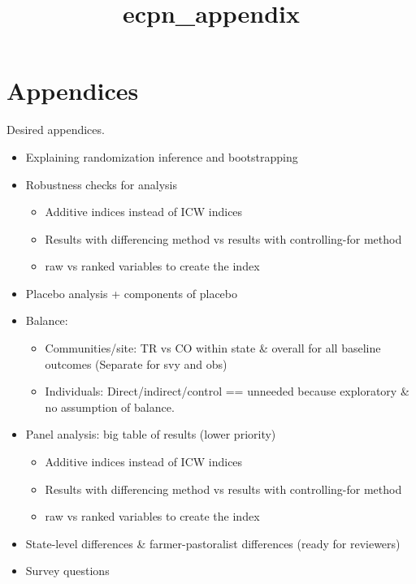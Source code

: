 \documentclass[
]{article}
\title{ecpn\_appendix}
\author{}
\date{\vspace{-2.5em}}
\providecommand{\tightlist}{%
  \setlength{\itemsep}{0pt}\setlength{\parskip}{0pt}}
\begin{document}
\maketitle

\hypertarget{appendices}{%
\section{Appendices}\label{appendices}}

Desired appendices.

\begin{itemize}
\tightlist
\item
  Explaining randomization inference and bootstrapping
\item
  Robustness checks for analysis

  \begin{itemize}
  \tightlist
  \item
    Additive indices instead of ICW indices
  \item
    Results with differencing method vs results with controlling-for
    method
  \item
    raw vs ranked variables to create the index
  \end{itemize}
\item
  Placebo analysis + components of placebo
\item
  Balance:

  \begin{itemize}
  \tightlist
  \item
    Communities/site: TR vs CO within state \& overall for all baseline
    outcomes (Separate for svy and obs)
  \item
    Individuals: Direct/indirect/control == unneeded because exploratory
    \& no assumption of balance.
  \end{itemize}
\item
  Panel analysis: big table of results (lower priority)

  \begin{itemize}
  \tightlist
  \item
    Additive indices instead of ICW indices
  \item
    Results with differencing method vs results with controlling-for
    method
  \item
    raw vs ranked variables to create the index
  \end{itemize}
\item
  State-level differences \& farmer-pastoralist differences (ready for
  reviewers)
\item
  Survey questions
\end{itemize}
\end{document}
